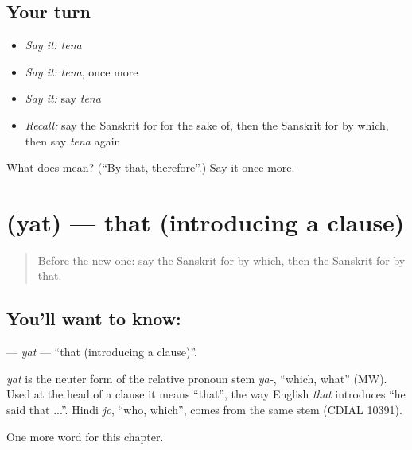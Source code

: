 \subsection*{Your turn}
\begin{itemize}
\raggedright
  \item \emph{Say it:} \emph{tena}
  \item \emph{Say it:} \emph{tena}, once more
  \item \emph{Say it:} say \emph{tena}
  \item \emph{Recall:} say the Sanskrit for for the sake of, then the Sanskrit for by which, then say \emph{tena} again
\end{itemize}

\begin{tcolorbox}[breakable,colback=teal!4,colframe=teal!35!black,title={Before you move on}]
What does  mean? (\textquotedblleft{}By that, therefore\textquotedblright{}.) Say it once more.
\end{tcolorbox}
\section[\texorpdfstring{\sk{यत्} (yat)}{यत् (yat)}]{ (yat) — that (introducing a clause)}

\label{lesson:SA-C241-yat}



\begin{quote}
Before the new one: say the Sanskrit for by which, then the Sanskrit for by that.
\end{quote}

\subsection*{You'll want to know: }
\textbf{} — \emph{yat} — \textquotedblleft{}that (introducing a clause)\textquotedblright{}.

\begin{cousinweb}
\emph{yat} is the neuter form of the relative pronoun stem \emph{ya-}, \textquotedblleft{}which, what\textquotedblright{} (MW). Used at the head of a clause it means \textquotedblleft{}that\textquotedblright{}, the way English \emph{that} introduces \textquotedblleft{}he said that ...\textquotedblright{}. Hindi \emph{jo}, \textquotedblleft{}who, which\textquotedblright{}, comes from the same stem (CDIAL 10391).
\end{cousinweb}

\begin{grammarlens}[title={What you've built}]
One more word for this chapter.
\end{grammarlens}

